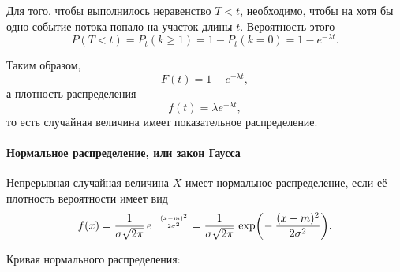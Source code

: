 \documentclass[a4paper]{article}
\DeclareMathOperator{\exp}{exp}
\newcommand{\sgeq}{\geqslant}
\newcommand{\sqrtt}[1]{\sqrt{\vphantom{qb} #1}}
\begin{document}
                    Для того, чтобы выполнилось неравенство $T < t$, необходимо, чтобы на хотя бы одно событие потока попало на участок длины $t$. Вероятность этого
                    \begin{equation*}
                        P(T < t) = P_t (k \sgeq 1) = 1 - P_t (k = 0) = 1 - e^{-\lambda t} .
                    \end{equation*}

                    Таким образом,
                    \begin{equation*}
                        F(t) = 1 - e^{-\lambda t} ,
                    \end{equation*}
                    а плотность распределения
                    \begin{equation*}
                        f(t) = \lambda e^{-\lambda t} ,
                    \end{equation*}
                    то есть случайная величина имеет показательное распределение.

                \paragraph{Нормальное распределение, или закон Гаусса}

                    Непрерывная случайная величина $X$ имеет нормальное распределение, если её плотность вероятности имеет вид
                    \begin{equation*}
                        f(x) = \frac{1}{\sigma \sqrtt{2 \pi}} \,
                            e^{-\frac{(x - m)^\text{\tiny 2}}{2 \sigma^\text{\tiny 2}}} =
                            \frac{1}{\sigma \sqrtt{2 \pi}} \,
                            \exp \! \bigg( \! -\frac{(x - m)^2}{2 \sigma^2} \bigg) .
                    \end{equation*}

                    Кривая нормального распределения:

\end{document}
